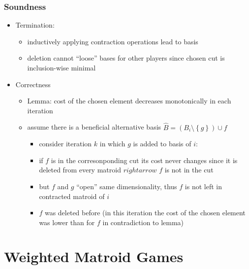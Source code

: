 \documentclass{beamer}
\newcommand{\set}[1]{\left\{#1\right\}}
\begin{document}
\begin{frame}
  \frametitle{Soundness}
  \begin{itemize}
    \item Termination:
      \begin{itemize}
        \item inductively applying contraction operations lead to basis
        \item deletion cannot \enquote{loose} bases for other players since
          chosen cut is inclusion-wise minimal
      \end{itemize}
    \item Correctness
      \begin{itemize}
        \item Lemma: cost of the chosen element decreases monotonically in each
          iteration
        \item assume there is a beneficial alternative basis
          $\hat{B} = (B_{i}\setminus\set{g})\cup{f}$
          \begin{itemize}
            \item consider iteration $k$ in which $g$ is added to basis of $i$:
            \item if $f$ is in the corresonponding cut its cost never changes
              since it is deleted from every matroid $rightarrow$ $f$ is not in
              the cut
            \item but $f$ and $g$ \enquote{open} same dimensionality, thus $f$
              is not left in contracted matroid of $i$
            \item $f$ was deleted before (in this iteration the cost of the
              chosen element was lower than for $f$ in contradiction to lemma)
          \end{itemize}
      \end{itemize}
  \end{itemize}
\end{frame}

\section{Weighted Matroid Games}
\begin{frame}
\end{frame}
\end{document}
